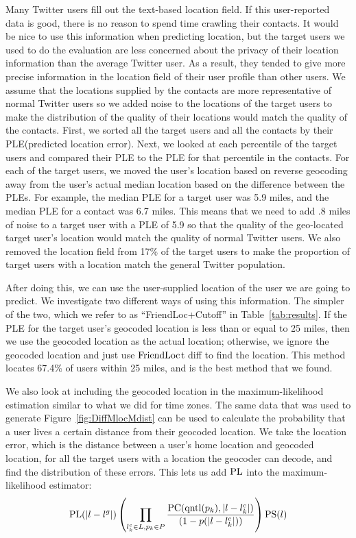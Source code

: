Many Twitter users fill out the text-based location field.
%
If this user-reported data is good, there is no reason to spend time
crawling their contacts.
%
It would be nice to use this information when predicting location, but
the target users we used to do the evaluation are less concerned about
the privacy of their location information than the average Twitter user.
%
As a result, they tended to give more precise information in the location
field of their user profile than other users.
%
We assume that the locations supplied by the contacts are more
representative of normal Twitter users so we added noise to the locations
of the target users to make the distribution of the quality of their
locations would match the quality of the contacts.
%
First, we sorted all the target users and all the contacts by their
PLE(predicted location error).
%
Next, we looked at each percentile of the target users and compared
their PLE to the PLE for that percentile in the contacts.
%
For each of the target users, we moved the user's location based on
reverse geocoding away from the user's actual median location based on the
difference between the PLEs.
%
For example, the median PLE for a target user was 5.9 miles, and the median
PLE for a contact was 6.7 miles.
%
This means that we need to add .8 miles of noise to a target user
with a PLE of 5.9 so that the quality of the geo-located target user's location
would match the quality of normal Twitter users.
%
We also removed the location field from 17\% of the target users to
make the proportion of target users with a location match the general
Twitter population.

After doing this, we can use the user-supplied location of the user we are
going to predict.
%
We investigate two different ways of using this information.
%
The simpler of the two, which we refer to as ``FriendLoc+Cutoff'' in
Table~\ref{tab:results}.
%
If the PLE for the target user's geocoded location is less than or equal to 25
miles, then we use the geocoded location as the actual location; otherwise, we
ignore the geocoded location and just use $\operatorname{FriendLoc}$t diff to find the location.
%
This method locates 67.4\% of users within 25 miles, and is the best method
that we found.

We also look at including the geocoded location in the maximum-likelihood
estimation similar to what we did for time zones.
%
The same data that was used to generate Figure~\ref{fig:DiffMlocMdist} can be
used to calculate the probability that a user lives a certain distance from
their geocoded location.
%
We take the location error, which is the distance between a user's home
location and geocoded location, for all the target users with a location the
geocoder can decode, and find the distribution of these errors.
%
This lets us add $\operatorname{PL}$ into the maximum-likelihood estimator:
\[
    \operatorname{PL}(|l-l^g|)
    \left(
        \prod_{l^c_k \in L,p_k \in P}
        {\operatorname{PC}(\operatorname{qntl}(p_k),|l-l^c_k|) \over (1-p(|l-l^c_k|))}
    \right)
    \operatorname{PS}(l)
\]


